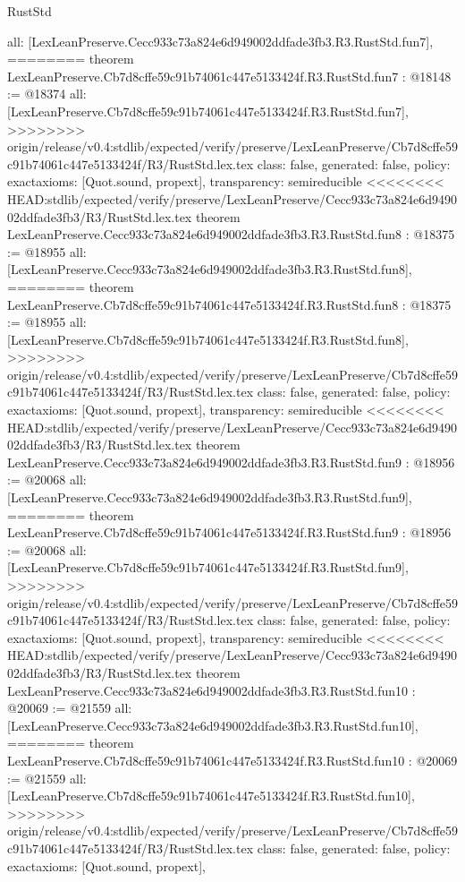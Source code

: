 \begin{lexlean}{RustStd}
\begin{coremodule}
{\begin{coremodule}
{{{{{{{{{{  all: [LexLeanPreserve.Cecc933c73a824e6d949002ddfade3fb3.R3.RustStd.fun7],
========
theorem LexLeanPreserve.Cb7d8cffe59c91b74061c447e5133424f.R3.RustStd.fun7 : @18148 := @18374 {
  all: [LexLeanPreserve.Cb7d8cffe59c91b74061c447e5133424f.R3.RustStd.fun7],
>>>>>>>> origin/release/v0.4:stdlib/expected/verify/preserve/LexLeanPreserve/Cb7d8cffe59c91b74061c447e5133424f/R3/RustStd.lex.tex
  class: false,
  generated: false,
  policy: exact{axioms: [Quot.sound, propext]},
  transparency: semireducible
}
<<<<<<<< HEAD:stdlib/expected/verify/preserve/LexLeanPreserve/Cecc933c73a824e6d949002ddfade3fb3/R3/RustStd.lex.tex
theorem LexLeanPreserve.Cecc933c73a824e6d949002ddfade3fb3.R3.RustStd.fun8 : @18375 := @18955 {
  all: [LexLeanPreserve.Cecc933c73a824e6d949002ddfade3fb3.R3.RustStd.fun8],
========
theorem LexLeanPreserve.Cb7d8cffe59c91b74061c447e5133424f.R3.RustStd.fun8 : @18375 := @18955 {
  all: [LexLeanPreserve.Cb7d8cffe59c91b74061c447e5133424f.R3.RustStd.fun8],
>>>>>>>> origin/release/v0.4:stdlib/expected/verify/preserve/LexLeanPreserve/Cb7d8cffe59c91b74061c447e5133424f/R3/RustStd.lex.tex
  class: false,
  generated: false,
  policy: exact{axioms: [Quot.sound, propext]},
  transparency: semireducible
}
<<<<<<<< HEAD:stdlib/expected/verify/preserve/LexLeanPreserve/Cecc933c73a824e6d949002ddfade3fb3/R3/RustStd.lex.tex
theorem LexLeanPreserve.Cecc933c73a824e6d949002ddfade3fb3.R3.RustStd.fun9 : @18956 := @20068 {
  all: [LexLeanPreserve.Cecc933c73a824e6d949002ddfade3fb3.R3.RustStd.fun9],
========
theorem LexLeanPreserve.Cb7d8cffe59c91b74061c447e5133424f.R3.RustStd.fun9 : @18956 := @20068 {
  all: [LexLeanPreserve.Cb7d8cffe59c91b74061c447e5133424f.R3.RustStd.fun9],
>>>>>>>> origin/release/v0.4:stdlib/expected/verify/preserve/LexLeanPreserve/Cb7d8cffe59c91b74061c447e5133424f/R3/RustStd.lex.tex
  class: false,
  generated: false,
  policy: exact{axioms: [Quot.sound, propext]},
  transparency: semireducible
}
<<<<<<<< HEAD:stdlib/expected/verify/preserve/LexLeanPreserve/Cecc933c73a824e6d949002ddfade3fb3/R3/RustStd.lex.tex
theorem LexLeanPreserve.Cecc933c73a824e6d949002ddfade3fb3.R3.RustStd.fun10 : @20069 := @21559 {
  all: [LexLeanPreserve.Cecc933c73a824e6d949002ddfade3fb3.R3.RustStd.fun10],
========
theorem LexLeanPreserve.Cb7d8cffe59c91b74061c447e5133424f.R3.RustStd.fun10 : @20069 := @21559 {
  all: [LexLeanPreserve.Cb7d8cffe59c91b74061c447e5133424f.R3.RustStd.fun10],
>>>>>>>> origin/release/v0.4:stdlib/expected/verify/preserve/LexLeanPreserve/Cb7d8cffe59c91b74061c447e5133424f/R3/RustStd.lex.tex
  class: false,
  generated: false,
  policy: exact{axioms: [Quot.sound, propext]},
}}}}}}}}}}}}}}
\end{coremodule}}
\end{coremodule}
\end{lexlean}
